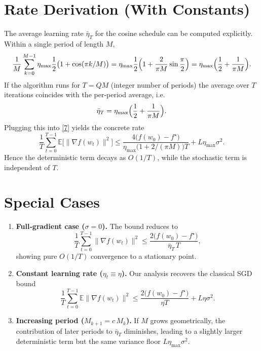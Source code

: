 \documentclass{article}
\begin{document}
\section*{Rate Derivation (With Constants)}
The average learning rate $\bar\eta_T$ for the cosine schedule can be computed explicitly.  
Within a single period of length $M$,
\[
\frac{1}{M}\sum_{k=0}^{M-1}\eta_{\max}\frac{1}{2}\bigl(1+\cos(\pi k/M)\bigr)
=\eta_{\max}\frac{1}{2}\Bigl(1+\frac{2}{\pi M}\sin\frac{\pi}{2}\Bigr)
=\eta_{\max}\Bigl(\frac{1}{2}+\frac{1}{\pi M}\Bigr).
\]
If the algorithm runs for $T=Q M$ (integer number of periods) the average over $T$ iterations coincides with the per‑period average, i.e.
\[
\bar\eta_T=\eta_{\max}\Bigl(\frac{1}{2}+\frac{1}{\pi M}\Bigr).
\]
Plugging this into \eqref{7} yields the concrete rate
\[
\frac{1}{T}\sum_{t=0}^{T-1}\mathbb{E}\big[\|\nabla f(w_t)\|^2\big]
\le
\frac{4\big(f(w_0)-f^\star\big)}{\eta_{\max}\big(1+2/(\pi M)\big)T}
+L\eta_{\max}\sigma^2 .
\]
Hence the deterministic term decays as $O(1/T)$, while the stochastic term is independent of $T$.

\section*{Special Cases}
\begin{enumerate}
\item \textbf{Full‑gradient case ($\sigma=0$).}  
The bound reduces to
\[
\frac{1}{T}\sum_{t=0}^{T-1}\|\nabla f(w_t)\|^2
\le\frac{2\big(f(w_0)-f^\star\big)}{\bar\eta_T\,T},
\]
showing pure $O(1/T)$ convergence to a stationary point.

\item \textbf{Constant learning rate ($\eta_t\equiv\eta$).}  
Our analysis recovers the classical SGD bound
\[
\frac{1}{T}\sum_{t=0}^{T-1}\mathbb{E}\|\nabla f(w_t)\|^2
\le\frac{2\big(f(w_0)-f^\star\big)}{\eta T}+L\eta\sigma^2 .
\]

\item \textbf{Increasing period ($M_{k+1}=c\,M_k$).}  
If $M$ grows geometrically, the contribution of later periods to $\bar\eta_T$ diminishes, leading to a slightly larger deterministic term but the same variance floor $L\eta_{\max}\sigma^2$.
\end{enumerate}

\end{document}
